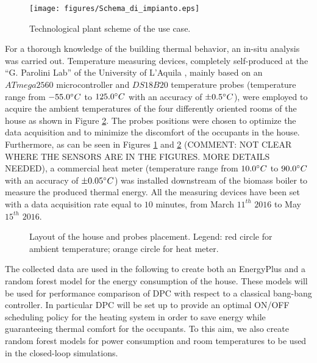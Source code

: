 \begin{figure}[h!]
	\begin{center}
		\texttt{[image: figures/Schema\_di\_impianto.eps]}
		\caption{Technological plant scheme of the use case.}
		\captionsetup{justification=centering}
		\label{F:housePlantScheme}
	\end{center}
\end{figure}
For a thorough knowledge of the building thermal behavior, an in-situ analysis was carried out. Temperature measuring devices, completely self-produced at the “G. Parolini Lab” of the University of L'Aquila \cite{Pantoli2017}, mainly based on an $ATmega 2560$ microcontroller and $DS18B20$ temperature probes (temperature range from $-55.0\degree C$ to $125.0\degree C$ with an accuracy of $\pm 0.5\degree C$), were employed to acquire the ambient temperatures of the four differently oriented rooms of the house as shown in Figure \ref{F:houseFloors}. The probes positions were chosen to optimize the data acquisition and to minimize the discomfort of the occupants in the house. Furthermore, as can be seen in Figures \ref{F:housePlantScheme} and \ref{F:houseFloors} (COMMENT: NOT CLEAR WHERE THE SENSORS ARE IN THE FIGURES. MORE DETAILS NEEDED), a commercial heat meter (temperature range from $10.0\degree C$ to $90.0\degree C$ with an accuracy of $\pm 0.05\degree C$) was installed downstream of the biomass boiler to measure the produced thermal energy. All the measuring devices have been set with a data acquisition rate equal to $10$ minutes, from March $11^{th}$ $2016$ to May $15^{th}$ $2016$.
\begin{figure}[h!]
	\begin{center}
	\end{center}
	\caption{Layout of the house and probes placement. Legend: red circle for ambient temperature; orange circle for heat meter.}
	\captionsetup{justification=centering}
	\label{F:houseFloors}
\end{figure}

The collected data are used in the following to create both an EnergyPlus and a random forest model for the energy consumption of the house. These models will be used for performance comparison of DPC with respect to a classical bang-bang controller. In particular DPC will be set up to provide an optimal ON/OFF scheduling policy for the heating system in order to save energy while guaranteeing thermal comfort for the occupants. To this aim, we also create random forest models for power consumption and room temperatures to be used in the closed-loop simulations. 

